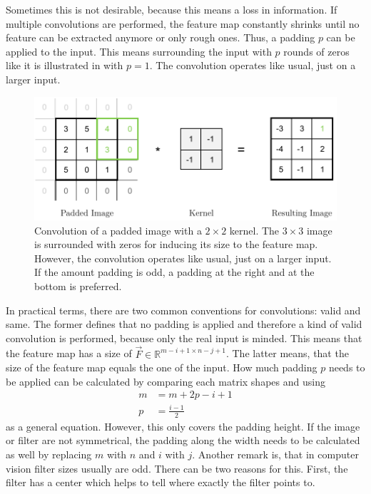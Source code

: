 Sometimes this is not desirable, because this means a loss in information.
If multiple convolutions are performed, the feature map constantly shrinks until no feature can be extracted anymore or only rough ones.
Thus, a padding $p$ can be applied to the input.
This means surrounding the input with $p$ rounds of zeros like it is illustrated in  with $p=1$.
The convolution operates like usual, just on a larger input.
\begin{figure}
	\centering
	\includegraphics{images/convolution_padding.pdf}
	\caption[Convolution of a Padded Image with a Kernel]{Convolution of a padded image with a $2 \times 2$ kernel. The $3 \times 3$ image is surrounded with zeros for inducing its size to the feature map. However, the convolution operates like usual, just on a larger input. If the amount padding is odd, a padding at the right and at the bottom is preferred.}
	\label{fig:convolution-padding}
\end{figure}
In practical terms, there are two common conventions for convolutions: valid and same.
The former defines that no padding is applied and therefore a kind of valid convolution is performed, because only the real input is minded.
This means that the feature map has a size of $\vec{F} \in \mathbb{R}^{m-i+1 \times n-j+1}$.
The latter means, that the size of the feature map equals the one of the input.
How much padding $p$ needs to be applied can be calculated by comparing each matrix shapes and using
\begin{align}
	m &= m+2p-i+1 \\
	p &= \frac{i-1}{2}
\end{align}
as a general equation.
However, this only covers the padding height.
If the image or filter are not symmetrical, the padding along the width needs to be calculated as well by replacing $m$ with $n$ and $i$ with $j$.
Another remark is, that in computer vision filter sizes usually are odd.
There can be two reasons for this.
First, the filter has a center which helps to tell where exactly the filter points to.
